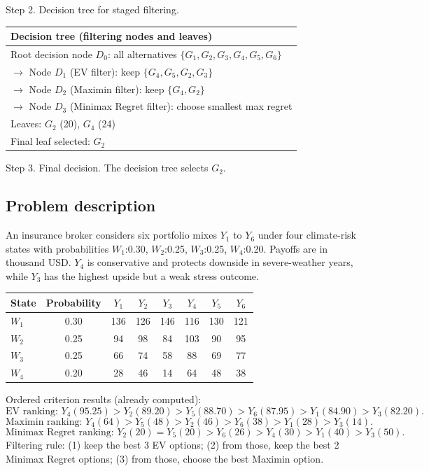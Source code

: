 \begin{ExamProblems}
		Step 2. Decision tree for staged filtering.
		\begin{center}
			\begin{tabular}{l}
				\toprule
				Decision tree (filtering nodes and leaves) \\
				\midrule
				Root decision node $D_0$: all alternatives $\{G_1,G_2,G_3,G_4,G_5,G_6\}$ \\
				$\rightarrow$ Node $D_1$ (EV filter): keep $\{G_4,G_5,G_2,G_3\}$ \\
				$\rightarrow$ Node $D_2$ (Maximin filter): keep $\{G_4,G_2\}$ \\
				$\rightarrow$ Node $D_3$ (Minimax Regret filter): choose smallest max regret \\
				Leaves: $G_2$ (20), $G_4$ (24) \\
				Final leaf selected: $G_2$ \\
				\bottomrule
			\end{tabular}
		\end{center}

		Step 3. Final decision.
		The decision tree selects $G_2$.

		\newpage
		\item\leavevmode\par
		\subsection*{Problem description}
		An insurance broker considers six portfolio mixes $Y_1$ to $Y_6$ under four climate-risk states with probabilities $W_1$:0.30, $W_2$:0.25, $W_3$:0.25, $W_4$:0.20.
		Payoffs are in thousand USD. $Y_4$ is conservative and protects downside in severe-weather years, while $Y_3$ has the highest upside but a weak stress outcome.
		\begin{center}
			\begin{tabular}{l c c c c c c c}
				\toprule
				State & Probability & $Y_1$ & $Y_2$ & $Y_3$ & $Y_4$ & $Y_5$ & $Y_6$ \\
				\midrule
				$W_1$ & 0.30 & 136 & 126 & 146 & 116 & 130 & 121 \\
				$W_2$ & 0.25 & 94 & 98 & 84 & 103 & 90 & 95 \\
				$W_3$ & 0.25 & 66 & 74 & 58 & 88 & 69 & 77 \\
				$W_4$ & 0.20 & 28 & 46 & 14 & 64 & 48 & 38 \\
				\bottomrule
			\end{tabular}
		\end{center}
		Ordered criterion results (already computed):
		\[
		\text{EV ranking: }Y_4(95.25)>Y_2(89.20)>Y_5(88.70)>Y_6(87.95)>Y_1(84.90)>Y_3(82.20).
		\]
		\[
		\text{Maximin ranking: }Y_4(64)>Y_5(48)>Y_2(46)>Y_6(38)>Y_1(28)>Y_3(14).
		\]
		\[
		\text{Minimax Regret ranking: }Y_2(20)=Y_5(20)>Y_6(26)>Y_4(30)>Y_1(40)>Y_3(50).
		\]
		Filtering rule:
		(1) keep the best 3 EV options;
		(2) from those, keep the best 2 Minimax Regret options;
		(3) from those, choose the best Maximin option.


\end{ExamProblems}
